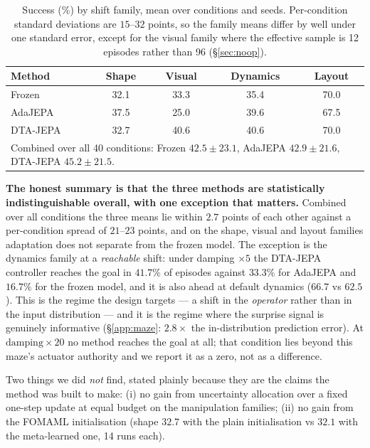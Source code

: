 \begin{table}[t]
\centering
\caption{Success (\%) by shift family, mean over conditions and seeds. Per-condition standard
deviations are $15$--$32$ points, so the family means differ by well under one standard error,
except for the visual family where the effective sample is 12 episodes rather than 96
(\S\ref{sec:noop}).}
\label{tab:famres}
\begin{tabular}{lcccc}
\toprule
Method & Shape & Visual & Dynamics & Layout \\ \midrule
Frozen & 32.1 & 33.3 & 35.4 & 70.0 \\
AdaJEPA & 37.5 & 25.0 & 39.6 & 67.5 \\
DTA-JEPA & 32.7 & 40.6 & 40.6 & 70.0 \\
\midrule
\multicolumn{5}{l}{Combined over all 40 conditions: Frozen $42.5 \pm 23.1$, AdaJEPA $42.9 \pm 21.6$, DTA-JEPA $45.2 \pm 21.5$.}\\
\bottomrule
\end{tabular}
\end{table}

\textbf{The honest summary is that the three methods are statistically indistinguishable
overall, with one exception that matters.} Combined over all conditions the three means lie
within $2.7$ points of each other against a per-condition spread of $21$--$23$ points, and on
the shape, visual and layout families adaptation does not separate from the frozen model. The
exception is the dynamics family at a \emph{reachable} shift: under damping $\times5$ the
DTA-JEPA controller reaches the goal in $41.7\%$ of episodes against $33.3\%$ for AdaJEPA and
$16.7\%$ for the frozen model, and it is also ahead at default dynamics ($66.7$ vs $62.5$).
This is the regime the design targets --- a shift in the \emph{operator} rather than in the
input distribution --- and it is the regime where the surprise signal is genuinely informative
(\S\ref{app:maze}: $2.8\times$ the in-distribution prediction error). At
$\text{damping}\times20$ no method reaches the goal at all; that condition lies beyond this
maze's actuator authority and we report it as a zero, not as a difference.

Two things we did \emph{not} find, stated plainly because they are the claims the method was
built to make: (i) no gain from uncertainty allocation over a fixed one-step update at equal
budget on the manipulation families; (ii) no gain from the FOMAML initialisation (shape $32.7$
with the plain initialisation vs $32.1$ with the meta-learned one, 14 runs each).

